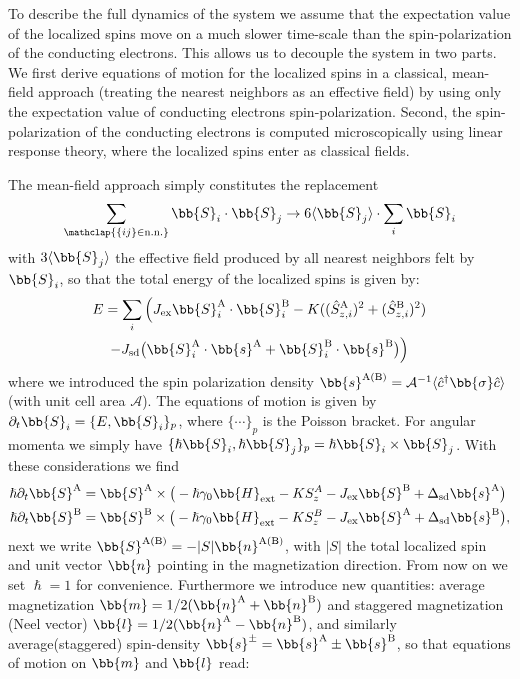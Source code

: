 To describe the full dynamics of the system we assume that the expectation value of the localized spins move on a much slower time-scale than the spin-polarization of the conducting electrons. This allows us to decouple the system in two parts. We first derive equations of motion for the localized spins in a classical, mean-field approach (treating the nearest neighbors as an effective field) by using only the expectation value of conducting electrons spin-polarization. Second, the spin-polarization of the conducting electrons is computed microscopically using linear response theory, where the localized spins enter as classical fields. 

The mean-field approach simply constitutes the replacement
\begin{equation}
    \sum_{\mathclap{\{ij\}\in\text{n.n.}}} \bb{S}_i\cdot\bb{S}_j\rightarrow6\langle\bb{S}_j\rangle\cdot\sum_i \bb{S}_i
\end{equation}
with $3 \langle \bb{S}_j\rangle$ the effective field produced by all nearest neighbors felt by $\bb{S}_i$, so that the total energy of the localized spins is given by:
\begin{multline}
    E = \sum_{i} \Big(J_{\text{ex}}\bb{S}^\text{A}_i\cdot\bb{S}^\text{B}_i 
    - K((\hat{S}_{z,i}^\text{A})^2+(\hat{S}_{z,i}^\text{B})^2)\\
    -J_{\text{sd}}\big(\bb{S}^\text{A}_i\cdot\bb{s}^\text{A}+\bb{S}^\text{B}_i\cdot\bb{s}^\text{B}\big)
        \Big)
        \label{intro:eq:E}
\end{multline}
where we introduced the spin polarization density $\bb{s}^\text{A(B)} = \mathcal{A}^{-1}\langle \hat{c}^\dagger \bb{\sigma}\hat{c}\rangle$ (with unit cell area $\mathcal{A}$). 
The equations of motion is given by $\partial_t \bb{S}_i = \{E,\bb{S}_i\}_p$, where $\{\cdots\}_p$ is the Poisson bracket. For angular momenta we simply have $\{\hslash \bb{S}_i,\hslash \bb{S}_j\}_p=\hslash \bb{S}_i\times\bb{S}_j$. With these considerations we find
\begin{align}
   \hslash \partial_t \bb{S}^\text{A} &= \bb{S}^\text{A}\times\big( -\hslash\gamma_0\bb{H}_\text{ext}-KS^A_z-J_\text{ex}\bb{S}^\text{B}+\Delta_\text{sd}\bb{s}^\text{A}\big)\\
      \hslash \partial_t \bb{S}^\text{B} &= \bb{S}^\text{B}\times\big( -\hslash\gamma_0\bb{H}_\text{ext}-KS^B_z-J_\text{ex}\bb{S}^\text{A}+\Delta_\text{sd}\bb{s}^\text{B}\big),
\end{align}
next we write $\bb{S}^\text{A(B)}=-|S|\bb{n}^\text{A(B)}$, with $|S|$ the total localized spin and unit vector $\bb{n}$ pointing in the magnetization direction. From now on we set $\hslash=1$ for convenience. Furthermore we introduce new quantities: average magnetization $\bb{m}=1/2(\bb{n}^\text{A}+\bb{n}^\text{B})$ and staggered magnetization (Neel vector) $\bb{l}=1/2(\bb{n}^\text{A}-\bb{n}^\text{B})$, and similarly average(staggered) spin-density $\bb{s}^\pm=\bb{s}^\text{A}\pm\bb{s}^\text{B}$, so that equations of motion on $\bb{m}$ and $\bb{l}$ read:
